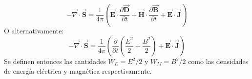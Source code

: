 \documentclass[../tesis_main_file.tex]{subfiles}
\begin{document}
\begin{equation}
-\overrightarrow{\nabla} \cdot \overrightarrow{\textbf{S}}= \frac{1}{4 \pi}\left(\overrightarrow{\textbf{E}}\cdot \frac{\partial \overrightarrow{\textbf{D}}}{\partial t} + \overrightarrow{\textbf{H}}\cdot \frac{\partial \overrightarrow{\textbf{B}}}{\partial t} + \overrightarrow{\textbf{E}}\cdot \overrightarrow{\textbf{J}} \right)
\end{equation}
O alternativamente:
\begin{equation}
-\overrightarrow{\nabla} \cdot \overrightarrow{\textbf{S}}= \frac{1}{4 \pi}\left(\frac{\partial}{\partial t}\left(\frac{E^2}{2} + \frac{B^2}{2}\right) + \overrightarrow{\textbf{E}}\cdot \overrightarrow{\textbf{J}} \right)
\end{equation}
Se definen entonces las cantidades $W_E=E^2/2$ y $W_M=B^2/2$ como las densidades de energía eléctrica y magnética respectivamente.
\onlyinsubfile{}
\onlyinsubfile{}
\end{document}
